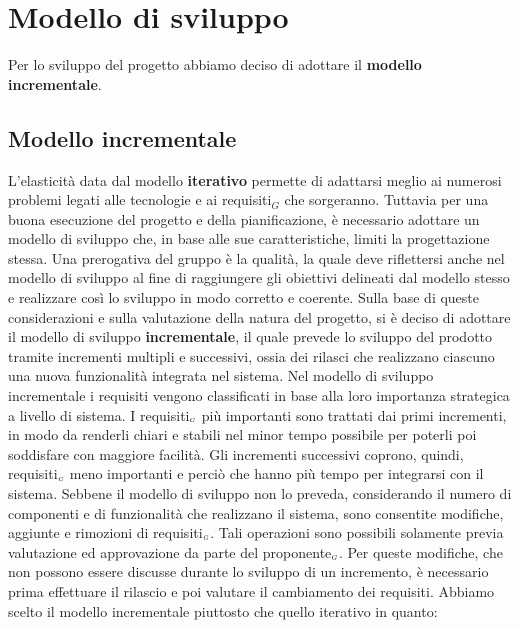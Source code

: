 \chapter{Modello di sviluppo}\label{ModelloDiSviluppo}
Per lo sviluppo del progetto abbiamo deciso di adottare il \textbf{modello incrementale}.
\section{Modello incrementale}\label{ModelloDiSviluppoModelloIncrementale}
L'elasticità data dal modello \textbf{iterativo} permette di adattarsi meglio ai numerosi problemi legati alle tecnologie e ai requisiti$_G$ che sorgeranno.
Tuttavia per una buona esecuzione del progetto e della pianificazione, è necessario adottare un modello di sviluppo che, in base alle sue caratteristiche, limiti la progettazione stessa. Una prerogativa del gruppo è la qualità, la quale deve riflettersi anche nel modello di sviluppo al fine di raggiungere gli obiettivi delineati dal modello stesso e realizzare così lo sviluppo in modo corretto e coerente.
Sulla base di queste considerazioni e sulla valutazione della natura del progetto, si è deciso di adottare il modello di sviluppo \textbf{incrementale}, il quale prevede lo sviluppo del prodotto tramite incrementi multipli e successivi, ossia dei rilasci che realizzano ciascuno una nuova funzionalità integrata nel sistema.
Nel modello di sviluppo incrementale i requisiti vengono classificati in base alla loro importanza strategica a livello di sistema. I requisiti$_{\scaleto{G}{3pt}}$ più importanti sono trattati dai primi incrementi, in modo da renderli chiari e stabili nel minor tempo possibile per poterli poi soddisfare con maggiore facilità.
Gli incrementi successivi coprono, quindi, requisiti$_{\scaleto{G}{3pt}}$ meno importanti e perciò che hanno più tempo per integrarsi con il sistema.
Sebbene il modello di sviluppo non lo preveda, considerando il numero di componenti e di funzionalità che realizzano il sistema, sono consentite modifiche, aggiunte e rimozioni di requisiti$_{\scaleto{G}{3pt}}$.
Tali operazioni sono possibili solamente previa valutazione ed approvazione da parte del proponente$_{\scaleto{G}{3pt}}$. Per queste modifiche, che non possono essere discusse durante lo sviluppo di un incremento, è necessario prima effettuare il rilascio e poi valutare il cambiamento dei requisiti.
Abbiamo scelto il modello incrementale piuttosto che quello iterativo in quanto:
